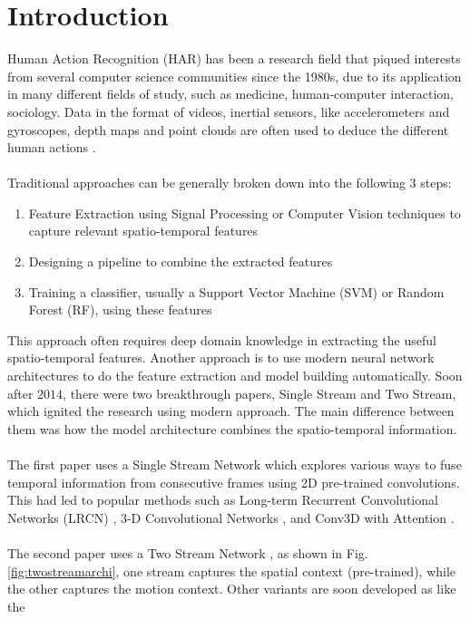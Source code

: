\documentclass[conference]{IEEEtran}
\begin{document}
\section{Introduction}
Human Action Recognition (HAR) has been a research field that piqued interests from several computer science communities since the 1980s, due to its application in many different fields of study, such as medicine, human-computer interaction, sociology. Data in the format of videos, inertial sensors, like accelerometers  and gyroscopes, depth maps and point clouds are often used to deduce the different human actions \cite{4487086}\cite{7881728}. \\ \\
Traditional approaches can be generally broken down into the following 3 steps:
\begin{enumerate}
\item Feature Extraction using Signal Processing or Computer Vision techniques to capture relevant spatio-temporal features \cite{5995407}\cite{1238378}\cite{1570899}
\item Designing a pipeline to combine the extracted features 
\item Training a classifier, usually a Support Vector Machine (SVM) or Random Forest (RF), using these features  
\end{enumerate}
\vspace{0.5cm}
This approach often requires deep domain knowledge in extracting the useful spatio-temporal features. Another approach is to use modern neural network architectures to do the feature extraction and model building automatically. Soon after $2014$, there were two breakthrough papers, Single Stream and Two Stream, which ignited the research using modern approach. The main difference between them was how the model architecture combines the spatio-temporal information. \\ \\
The first paper \cite{KarpathyCVPR14} uses a 
Single Stream Network which explores various ways to fuse temporal information from consecutive frames using 2D pre-trained convolutions. This had led to popular methods such as Long-term Recurrent Convolutional Networks (LRCN) \cite{DonahueHGRVSD14},
3-D Convolutional Networks \cite{TranBFTP14}, and 
Conv3D with Attention \cite{YaoTCBPLC}. \\ \\
The second paper uses a Two Stream Network \cite{SimonyanZ14}, as shown in Fig. \ref{fig:twostreamarchi}, one stream captures the spatial context (pre-trained), while the other captures the motion context. Other variants are soon developed as like the 
\end{document}

